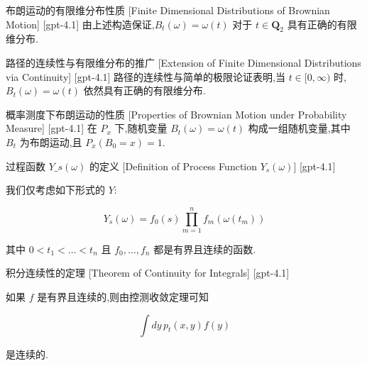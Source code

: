 \documentclass[UTF8]{ctexart}
\begin{document}
    
    
    \begin{ppt}
        {布朗运动的有限维分布性质}
        [Finite Dimensional Distributions of Brownian Motion]
        [gpt-4.1]
        由上述构造保证,$B_t(\omega) = \omega(t)$ 对于 $t \in \mathbf{Q}_2$ 具有正确的有限维分布.
    \end{ppt}
    
    
    
    \begin{ppt}
        {路径的连续性与有限维分布的推广}
        [Extension of Finite Dimensional Distributions via Continuity]
        [gpt-4.1]
        路径的连续性与简单的极限论证表明,当 $t \in [0, \infty)$ 时,$B_t(\omega) = \omega(t)$ 依然具有正确的有限维分布.
    \end{ppt}
    
    
    
    \begin{ppt}
        {概率测度下布朗运动的性质}
        [Properties of Brownian Motion under Probability Measure]
        [gpt-4.1]
        在 $P_x$ 下,随机变量 $B_t(\omega) = \omega(t)$ 构成一组随机变量,其中 $B_t$ 为布朗运动,且 $P_x(B_0 = x) = 1$.
    \end{ppt}
    
    
    
    \begin{dfn}
        {过程函数 $Y\_s(\omega)$ 的定义}
        [Definition of Process Function $Y_s(\omega)$]
        [gpt-4.1]
        
我们仅考虑如下形式的 $Y$:

\[
Y_{s}(\omega) = f_{0}(s) \prod_{m=1}^{n} f_{m}(\omega(t_{m}))
\]

其中 $0 < t_{1} < \ldots < t_{n}$ 且 $f_{0}, \ldots, f_{n}$ 都是有界且连续的函数.

    \end{dfn}
    
    
    
    \begin{thm}
        {积分连续性的定理}
        [Theorem of Continuity for Integrals]
        [gpt-4.1]
        
如果 $f$ 是有界且连续的,则由控测收敛定理可知

\[
\int d y\, p_{t}(x, y) f(y)
\]

是连续的.

    \end{thm}
    
\end{document}
